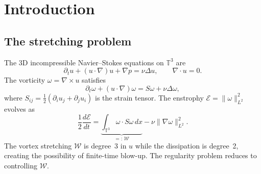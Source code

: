 \documentclass[11pt,a4paper]{article}
\theoremstyle{plain}
\theoremstyle{definition}
\theoremstyle{remark}
\newcommand{\T}{\mathbb{T}}
\begin{document}
\begin{abstract}
This identifies a precise analytical target for
regularity: prove that
$\langle\hat\omega\cdot P\hat\omega\rangle_{\rm enst}
\leq 0$ when vorticity is preferentially aligned with
the intermediate strain eigenvector.  If this holds, the
combined restricted-Euler-plus-pressure dynamics maintain
$\rho\leq\rho^*+\varepsilon < 1$, giving a
degree-0 depletion of vortex stretching that persists
along all smooth NS trajectories.

\smallskip\noindent\textbf{MSC 2020:} 35Q30, 76D05,
76F02, 35B65.

\smallskip\noindent\textbf{Keywords:}
Navier--Stokes; vortex stretching; eigenvalue selection;
strain--vorticity alignment; pressure Hessian;
restricted Euler; nonlinearity depletion; regularity.
\end{abstract}

\tableofcontents
\newpage

\section{Introduction}\label{sec:intro}

\subsection{The stretching problem}

The 3D incompressible Navier--Stokes equations on
$\T^3$ are
\begin{equation}\label{eq:NS}
\partial_t u + (u\cdot\nabla)u + \nabla p = \nu\Delta u,
\qquad \nabla\cdot u = 0.
\end{equation}
The vorticity $\omega = \nabla\times u$ satisfies
\begin{equation}\label{eq:vort}
\partial_t\omega + (u\cdot\nabla)\omega
= S\omega + \nu\Delta\omega,
\end{equation}
where $S_{ij} = \frac{1}{2}(\partial_i u_j+\partial_j u_i)$
is the strain tensor.  The enstrophy
$\mathcal{E} = \|\omega\|_{L^2}^2$ evolves as
\begin{equation}\label{eq:enstrophy}
\frac{1}{2}\frac{d\mathcal{E}}{dt}
= \underbrace{\int_{\T^3}\omega\cdot S\omega\,dx}_{=:\,\mathcal{W}}
- \nu\|\nabla\omega\|_{L^2}^2.
\end{equation}
The vortex stretching $\mathcal{W}$ is degree~3 in $u$
while the dissipation is degree~2, creating the
possibility of finite-time blow-up.  The regularity
problem reduces to controlling $\mathcal{W}$.
\end{document}
